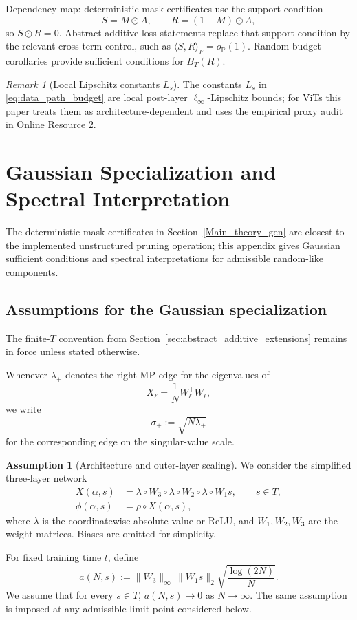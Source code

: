 \documentclass[11pt]{article}
\theoremstyle{plain}
\theoremstyle{definition}
\newtheorem{assumption}[thm]{Assumption}
\theoremstyle{remark}
\newtheorem{rem}[thm]{Remark}
\newcommand{\PP}{\mathbb{P}}
\newcommand{\1}{\mathbf{1}}
\begin{document}
Dependency map: deterministic mask certificates use the support condition
\[
S=M\odot A,\qquad R=(1-M)\odot A,
\]
so \(S\odot R=0\). Abstract additive loss statements replace that support condition by the relevant cross-term control, such as \(\langle S,R\rangle_F=o_{\PP}(1)\). Random budget corollaries provide sufficient conditions for \(B_T(R)\).

\begin{rem}[Local Lipschitz constants $L_s$]
\label{rem:lipschitz_local}
The constants \(L_s\) in \eqref{eq:data_path_budget} are local post-layer \(\ell_\infty\)-Lipschitz bounds; for ViTs this paper treats them as architecture-dependent and uses the empirical proxy audit in Online Resource 2.
\end{rem}

\section{Gaussian Specialization and Spectral Interpretation}
\label{Main_theory}

The deterministic mask certificates in Section~\ref{Main_theory_gen} are closest to the implemented unstructured pruning operation; this appendix gives Gaussian sufficient conditions and spectral interpretations for admissible random-like components.

\subsection{Assumptions for the Gaussian specialization}
\label{assumptions}

The finite-\(T\) convention from Section~\ref{sec:abstract_additive_extensions} remains in force unless stated otherwise.

Whenever \(\lambda_+\) denotes the right MP edge for the eigenvalues of
\[
X_\ell=\frac1N W_\ell^\top W_\ell,
\]
we write
\[
\sigma_+ := \sqrt{N\lambda_+}
\]
for the corresponding edge on the singular-value scale.

\begin{assumption}[Architecture and outer-layer scaling]
\label{as1}
We consider the simplified three-layer network
\begin{align}
X(\alpha,s) &= \lambda\circ W_3 \circ \lambda\circ W_2 \circ \lambda\circ W_1 s,\qquad s\in T,\\
\phi(\alpha,s) &= \rho\circ X(\alpha,s),
\end{align}
where \(\lambda\) is the coordinatewise absolute value or ReLU, and \(W_1,W_2,W_3\) are the weight matrices. Biases are omitted for simplicity.

For fixed training time \(t\), define
\begin{equation}
\label{eqans}
a(N,s):=\|W_3\|_{\infty}\,\|W_1s\|_2\sqrt{\frac{\log(2N)}{N}}.
\end{equation}
We assume that for every \(s\in T\), \(a(N,s)\to 0\) as \(N\to\infty\). The same assumption is imposed at any admissible limit point considered below.
\end{assumption}
\end{document}
